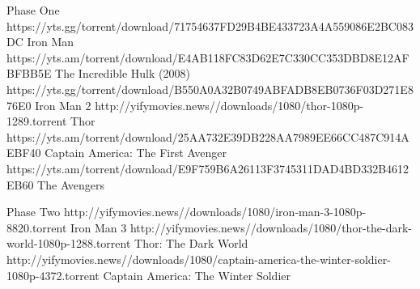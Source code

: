Phase One
https://yts.gg/torrent/download/71754637FD29B4BE433723A4A559086E2BC083DC
Iron Man
https://yts.am/torrent/download/E4AB118FC83D62E7C330CC353DBD8E12AFBFBB5E
The Incredible Hulk (2008)
https://yts.gg/torrent/download/B550A0A32B0749ABFADB8EB0736F03D271E876E0
Iron Man 2
http://yifymovies.news//downloads/1080/thor-1080p-1289.torrent
Thor
https://yts.am/torrent/download/25AA732E39DB228AA7989EE66CC487C914AEBF40
Captain America: The First Avenger
https://yts.am/torrent/download/E9F759B6A26113F3745311DAD4BD332B4612EB60
The Avengers

Phase Two
http://yifymovies.news//downloads/1080/iron-man-3-1080p-8820.torrent
Iron Man 3
http://yifymovies.news//downloads/1080/thor-the-dark-world-1080p-1288.torrent
Thor: The Dark World
http://yifymovies.news//downloads/1080/captain-america-the-winter-soldier-1080p-4372.torrent 
Captain America: The Winter Soldier